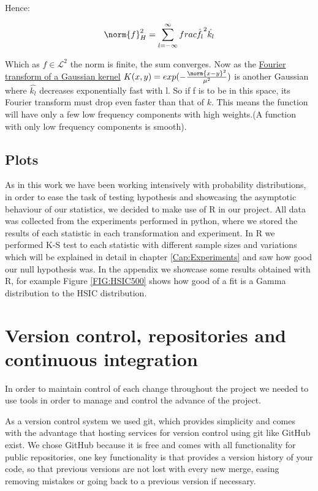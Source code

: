 Hence:

$$
\norm{f}^{2}_{H}= \sum_{l=-\infty}^{\infty}frac{\hat{f_{l}}^{2}}{\hat{k_{l}}}
$$

Which as $f\in\mathcal{L}^{2}$ the norm is finite, the sum converges. Now as the  \href{http://mathworld.wolfram.com/FourierTransformGaussian.html}{Fourier transform of a Gaussian kernel}  $K(x,y) = exp(-\frac{\norm{x-y}^{2}}{\mu^{2}})$ is another Gaussian where $\hat{k_{l}}$ decreases exponentially fast with l. So if f is to be in this space, its Fourier transform must drop even faster than that of $k$. This means the function will have only a few low frequency components with high weights.(A function with only low frequency components is smooth). 


\label{Plots}\subsection{Plots} 

As in this work we have been working intensively with probability distributions, in order to ease the task of testing hypothesis and showcasing the asymptotic behaviour of our statistics, we decided to make use of R in our project. All data was collected from the experiments performed in python, where we stored the results of each statistic in each transformation and experiment.
In R we performed K-S test to each statistic with different sample sizes and variations which will be explained in detail in chapter \ref{Cap:Experiments} and saw how good our null hypothesis was. In the appendix we showcase some results obtained with R, for example Figure \ref{FIG:HSIC500} shows how good of a fit is a Gamma distribution to the HSIC distribution.

\section{Version control, repositories and continuous integration}

In order to maintain control of each change throughout the project we needed to use tools in order to manage and control the advance of the project.

As a version control system we used git, which provides simplicity and comes with the advantage that hosting services for version control using git like GitHub exist. We chose GitHub because it is free and comes with all functionality for public repositories, one key functionality is that provides a version history of your code, so that previous versions are not lost with every new merge, easing removing mistakes or going back to a previous version if necessary. 

